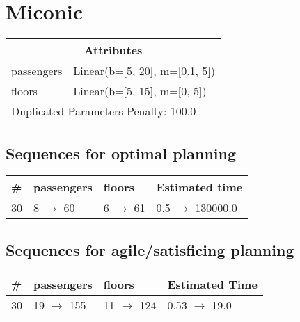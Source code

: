 \documentclass{article}
\begin{document}
                            \newpage \section{Miconic}
                    \begin{center}
                    \begin{tabular}{@{}p{}p{}@{}}
                    \multicolumn{2}{c}{\bf \large Attributes}\\\midrule
                    passengers & Linear(b=[5, 20], m=[0.1, 5])\\
floors & Linear(b=[5, 15], m=[0, 5]) \\\midrule
                    \multicolumn{2}{l}{Duplicated Parameters Penalty: 100.0}
                    \end{tabular}
                    \end{center}
                
                            \subsection*{Sequences for optimal planning}

                            \begin{center}
                            \begin{tabular}{@{}l|l|l|l@{}}
                            \# & passengers & floors & Estimated time\\\midrule
                            30&8 $\rightarrow$ 60&6 $\rightarrow$ 61&0.5 $\rightarrow$ 130000.0
                            \end{tabular}
                            \end{center}
                    
                         \subsection*{Sequences for agile/satisficing planning}

                        \begin{center}
                        \begin{tabular}{@{}l|l|l|l@{}}
                        \# & passengers & floors & Estimated Time\\\midrule
                        30&19 $\rightarrow$ 155&11 $\rightarrow$ 124&0.53 $\rightarrow$ 19.0
                        \end{tabular}
                        \end{center}
                    
\end{document}
